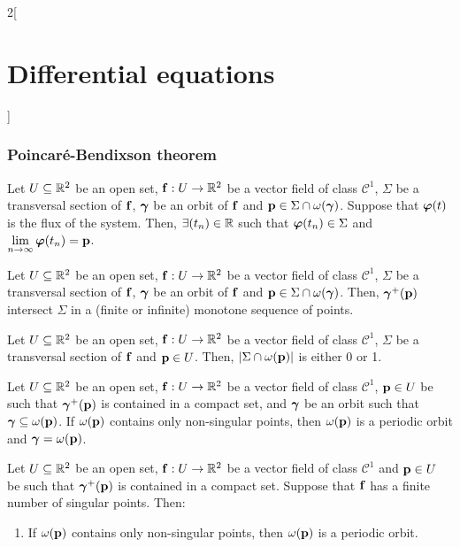 \documentclass[../../../main_math.tex]{subfiles}
\begin{document}
\begin{multicols}{2}[\section{Differential equations}]
  \subsubsection{Poincaré-Bendixson theorem}
  \begin{lemma}
    Let $U\subseteq \mathbb{R}^2$ be an open set, $\boldsymbol{\mathrm{f}}:U\rightarrow\mathbb{R}^2$ be a vector field of class $\mathcal{C}^1$, $\Sigma$ be a transversal section of $\boldsymbol{\mathrm{f}}$, $\boldsymbol{\mathrm{\gamma}}$ be an orbit of $\boldsymbol{\mathrm{f}}$ and $\boldsymbol{\mathrm{p}}\in\Sigma\cap\omega(\boldsymbol{\mathrm{\gamma}})$. Suppose that $\boldsymbol{\mathrm{\varphi}}(t)$ is the flux of the system. Then, $\exists (t_n)\in\mathbb{R}$ such that $\boldsymbol{\mathrm{\varphi}}(t_n)\in\Sigma$ and $\displaystyle\lim_{n\to\infty}\boldsymbol{\mathrm{\varphi}}(t_n)=\boldsymbol{\mathrm{p}}$.
  \end{lemma}
  \begin{lemma}
    Let $U\subseteq \mathbb{R}^2$ be an open set, $\boldsymbol{\mathrm{f}}:U\rightarrow\mathbb{R}^2$ be a vector field of class $\mathcal{C}^1$, $\Sigma$ be a transversal section of $\boldsymbol{\mathrm{f}}$, $\boldsymbol{\mathrm{\gamma}}$ be an orbit of $\boldsymbol{\mathrm{f}}$ and $\boldsymbol{\mathrm{p}}\in\Sigma\cap\omega(\boldsymbol{\mathrm{\gamma}})$. Then, ${\boldsymbol{\mathrm{\gamma}}}^+(\boldsymbol{\mathrm{p}})$ intersect $\Sigma$ in a (finite or infinite) monotone sequence of points.
  \end{lemma}
  \begin{lemma}
    Let $U\subseteq \mathbb{R}^2$ be an open set, $\boldsymbol{\mathrm{f}}:U\rightarrow\mathbb{R}^2$ be a vector field of class $\mathcal{C}^1$, $\Sigma$ be a transversal section of $\boldsymbol{\mathrm{f}}$ and $\boldsymbol{\mathrm{p}}\in U$. Then, $\left|\Sigma\cap\omega(\boldsymbol{\mathrm{p}})\right|$ is either 0 or 1.
  \end{lemma}
  \begin{lemma}
    Let $U\subseteq \mathbb{R}^2$ be an open set, $\boldsymbol{\mathrm{f}}:U\rightarrow\mathbb{R}^2$ be a vector field of class $\mathcal{C}^1$, $\boldsymbol{\mathrm{p}}\in U$ be such that ${\boldsymbol{\mathrm{\gamma}}}^+(\boldsymbol{\mathrm{p}})$ is contained in a compact set, and $\boldsymbol{\mathrm{\gamma}}$ be an orbit such that $\boldsymbol{\mathrm{\gamma}}\subseteq \omega(\boldsymbol{\mathrm{p}})$. If $\omega(\boldsymbol{\mathrm{p}})$ contains only non-singular points, then $\omega(\boldsymbol{\mathrm{p}})$ is a periodic orbit and $\boldsymbol{\mathrm{\gamma}}=\omega(\boldsymbol{\mathrm{p}})$.
  \end{lemma}
  \begin{theorem}
    Let $U\subseteq \mathbb{R}^2$ be an open set, $\boldsymbol{\mathrm{f}}:U\rightarrow\mathbb{R}^2$ be a vector field of class $\mathcal{C}^1$ and $\boldsymbol{\mathrm{p}}\in U$ be such that ${\boldsymbol{\mathrm{\gamma}}}^+(\boldsymbol{\mathrm{p}})$ is contained in a compact set. Suppose that $\boldsymbol{\mathrm{f}}$ has a finite number of singular points. Then:
    \begin{enumerate}
      \item If $\omega(\boldsymbol{\mathrm{p}})$ contains only non-singular points, then $\omega(\boldsymbol{\mathrm{p}})$ is a periodic orbit.

\end{enumerate}
\end{theorem}
\end{multicols}
\end{document}
